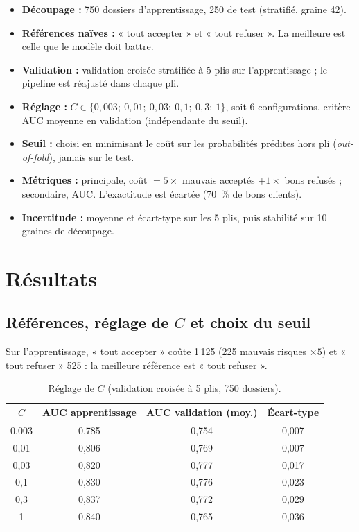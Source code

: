\documentclass[11pt,a4paper]{article}
\begin{document}
\begin{itemize}
\item \textbf{Découpage :} 750 dossiers d'apprentissage, 250 de test (stratifié, graine 42).
\item \textbf{Références naïves :} « tout accepter » et « tout refuser ». La meilleure est celle que le modèle doit battre.
\item \textbf{Validation :} validation croisée stratifiée à 5 plis sur l'apprentissage ; le pipeline est réajusté dans chaque pli.
\item \textbf{Réglage :} $C \in \{0{,}003;\ 0{,}01;\ 0{,}03;\ 0{,}1;\ 0{,}3;\ 1\}$, soit 6 configurations, critère AUC moyenne en validation (indépendante du seuil).
\item \textbf{Seuil :} choisi en minimisant le coût sur les probabilités prédites hors pli (\textit{out-of-fold}), jamais sur le test.
\item \textbf{Métriques :} principale, coût $= 5\times$ mauvais acceptés $+ 1\times$ bons refusés ; secondaire, AUC. L'exactitude est écartée (70~\% de bons clients).
\item \textbf{Incertitude :} moyenne et écart-type sur les 5 plis, puis stabilité sur 10 graines de découpage.
\end{itemize}

\section{Résultats}

\subsection{Références, réglage de \texorpdfstring{$C$}{C} et choix du seuil}

Sur l'apprentissage, « tout accepter » coûte 1\,125 (225 mauvais risques $\times 5$) et « tout refuser » 525 : la meilleure référence est « tout refuser ».

\begin{table}[htbp]
\centering
\caption{Réglage de $C$ (validation croisée à 5 plis, 750 dossiers).}
\small
\begin{tabular}{@{}cccc@{}}
\toprule
$C$ & AUC apprentissage & AUC validation (moy.) & Écart-type\\
\midrule
0,003 & 0,785 & 0,754 & 0,007\\
0,01 & 0,806 & 0,769 & 0,007\\
0,03 & 0,820 & 0,777 & 0,017\\
0,1 & 0,830 & 0,776 & 0,023\\
0,3 & 0,837 & 0,772 & 0,029\\
1 & 0,840 & 0,765 & 0,036\\
\bottomrule
\end{tabular}
\end{table}
\end{document}
